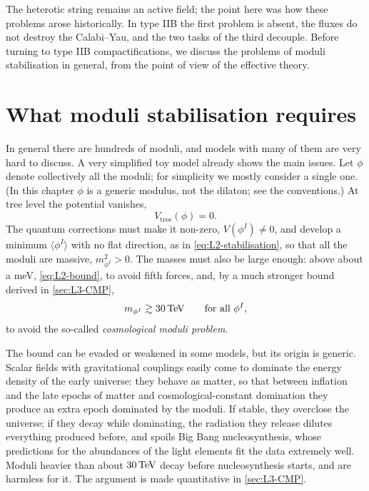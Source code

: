 The heterotic string remains an active field; the point here was how these problems arose historically. In type IIB the first problem is absent, the fluxes do not destroy the Calabi--Yau, and the two tasks of the third decouple. Before turning to type IIB compactifications, we discuss the problems of moduli stabilisation in general, from the point of view of the effective theory.

\section{What moduli stabilisation requires}
\label{sec:L3-requirements}

In general there are hundreds of moduli, and models with many of them are very hard to discuss. A very simplified toy model already shows the main issues. Let $\phi$ denote collectively all the moduli; for simplicity we mostly consider a single one. (In this chapter $\phi$ is a generic modulus, not the dilaton; see the conventions.) At tree level the potential vanishes,
\begin{equation}
  V_{\text{tree}}(\phi) = 0 .
  \label{eq:L3-Vtree}
\end{equation}
The quantum corrections must make it non-zero, $V(\phi^I)\neq0$, and develop a minimum $\langle\phi^I\rangle$ with no flat direction, as in \cref{eq:L2-stabilisation}, so that all the moduli are massive, $m^2_{\phi^I}>0$. The masses must also be large enough: above about a meV, \cref{eq:L2-bound}, to avoid fifth forces, and, by a much stronger bound derived in \cref{sec:L3-CMP},
\begin{equation}
  m_{\phi^I}\gtrsim30\,\mathrm{TeV}\qquad\text{for all } \phi^I ,
  \label{eq:L3-CMP-bound}
\end{equation}
to avoid the so-called \emph{cosmological moduli problem}.

The bound can be evaded or weakened in some models, but its origin is generic. Scalar fields with gravitational couplings easily come to dominate the energy density of the early universe: they behave as matter, so that between inflation and the late epochs of matter and cosmological-constant domination they produce an extra epoch dominated by the moduli. If stable, they overclose the universe; if they decay while dominating, the radiation they release dilutes everything produced before, and spoils Big Bang nucleosynthesis, whose predictions for the abundances of the light elements fit the data extremely well. Moduli heavier than about $30\,\mathrm{TeV}$ decay before nucleosynthesis starts, and are harmless for it. The argument is made quantitative in \cref{sec:L3-CMP}.

